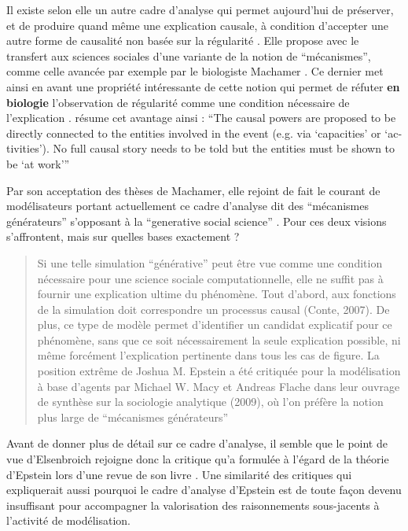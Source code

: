 Il existe selon elle un autre cadre d'analyse qui permet aujourd'hui de préserver, et de produire quand même une explication causale, à condition d'accepter une autre forme de causalité non basée sur la régularité . Elle propose avec \textcite{Hedstrom2010} le transfert aux sciences sociales d'une variante de la notion de \enquote{mécanismes}, comme celle avancée par exemple par le biologiste Machamer \textcite{Machamer2000}. Ce dernier met ainsi en avant une propriété intéressante de cette notion qui permet de réfuter \textbf{en biologie} l'observation de régularité comme une condition nécessaire de l'explication . \textcite{Elsenbroich2012} résume cet avantage ainsi : \foreignquote{english}{The causal powers are proposed to be directly connected to the entities involved in the event (e.g. via \enquote{capacities} or \enquote{activities}). No full causal story needs to be told but the entities must be shown to be \enquote{at work}} 

Par son acceptation des thèses de Machamer, elle rejoint de fait le courant de modélisateurs portant actuellement ce cadre d'analyse dit des \enquote{mécanismes générateurs} \autocites{Hedstrom2010, Manzo2007} s'opposant à la \enquote{generative social science} \autocite{Epstein1999}. Pour \textcite[698]{Livet2014} ces deux visions s'affrontent, mais sur quelles bases exactement ? 

\blockquote[\cite{Livet2014}]{Si une telle simulation \enquote{générative} peut être vue comme une condition nécessaire pour une science sociale computationnelle, elle ne suffit pas à fournir une explication ultime du phénomène. Tout d’abord, aux fonctions de la simulation doit correspondre un processus causal (Conte, 2007). De plus, ce type de modèle permet d’identifier un candidat explicatif pour ce phénomène, sans que ce soit nécessairement la seule explication possible, ni même forcément l’explication pertinente dans tous les cas de figure. La position extrême de Joshua M. Epstein a été critiquée pour la modélisation à base d’agents par Michael W. Macy et Andreas Flache dans leur ouvrage de synthèse sur la sociologie analytique (2009), où l’on préfère la notion plus large de \enquote{mécanismes générateurs}} 

Avant de donner plus de détail sur ce cadre d'analyse, il semble que le point de vue d'Elsenbroich rejoigne donc la critique qu'a formulée \textcite{Conte2007} à l'égard de la théorie d'Epstein lors d'une revue de son livre \autocite{Epstein2007d}. Une similarité des critiques qui expliquerait aussi pourquoi le cadre d'analyse d'Epstein est de toute façon devenu insuffisant pour accompagner la valorisation des raisonnements sous-jacents à l'activité de modélisation.

